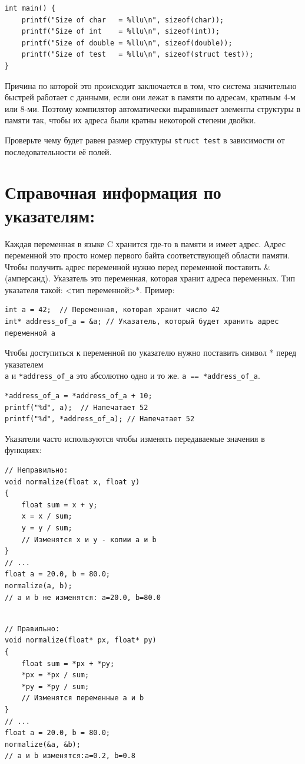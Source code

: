 \documentclass{article}
\begin{document}
\begin{lstlisting}
int main() {
    printf("Size of char   = %llu\n", sizeof(char));
    printf("Size of int    = %llu\n", sizeof(int));
    printf("Size of double = %llu\n", sizeof(double));
    printf("Size of test   = %llu\n", sizeof(struct test));
}
\end{lstlisting}

Причина по которой это происходит заключается в том, что система значительно быстрей работает с данными, если они лежат в памяти по адресам, кратным 4-м или 8-ми. Поэтому компилятор автоматически выравнивает элементы структуры в памяти так, чтобы их адреса были кратны некоторой степени двойки.

Проверьте чему будет равен размер структуры \texttt{struct test} в зависимости от последовательности её полей.


\iffalse
\newpage
\section*{Справочная информация по указателям:}
Каждая переменная в языке C хранится где-то в памяти и имеет адрес. Адрес переменной это просто номер первого байта соответствующей области памяти. Чтобы получить адрес переменной нужно перед переменной поставить \&(амперсанд).
Указатель это переменная, которая хранит адреса переменных. Тип указателя такой: <тип переменной>*. Пример:
\begin{lstlisting}
int a = 42;  // Переменная, которая хранит число 42
int* address_of_a = &a; // Указатель, который будет хранить адрес переменной a
\end{lstlisting}
Чтобы доступиться к переменной по указателю нужно поставить символ * перед указателем\\
\texttt{a} и \texttt{*address\_of\_a} это абсолютно одно и то же. \texttt{a  ==  *address\_of\_a}.
\begin{lstlisting}
*address_of_a = *address_of_a + 10;
printf("%d", a);  // Напечатает 52
printf("%d", *address_of_a); // Напечатает 52
\end{lstlisting}
Указатели часто используются чтобы изменять передаваемые значения в функциях:
\begin{multicols}{2}
\begin{lstlisting}
// Неправильно:
void normalize(float x, float y)
{
    float sum = x + y;
    x = x / sum;
    y = y / sum; 
    // Изменятся x и y - копии a и b
}
// ...
float a = 20.0, b = 80.0;
normalize(a, b);
// a и b не изменятся: a=20.0, b=80.0
\end{lstlisting}
\begin{lstlisting}

// Правильно:
void normalize(float* px, float* py)
{
    float sum = *px + *py;
    *px = *px / sum;
    *py = *py / sum; 
    // Изменятся переменные a и b
}
// ...
float a = 20.0, b = 80.0;
normalize(&a, &b);
// a и b изменятся:a=0.2, b=0.8
\end{lstlisting}
\end{multicols}
\end{document}
